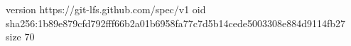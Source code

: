 version https://git-lfs.github.com/spec/v1
oid sha256:1b89e879cfd792fff66b2a01b6958fa77c7d5b14cede5003308e884d9114fb27
size 70
